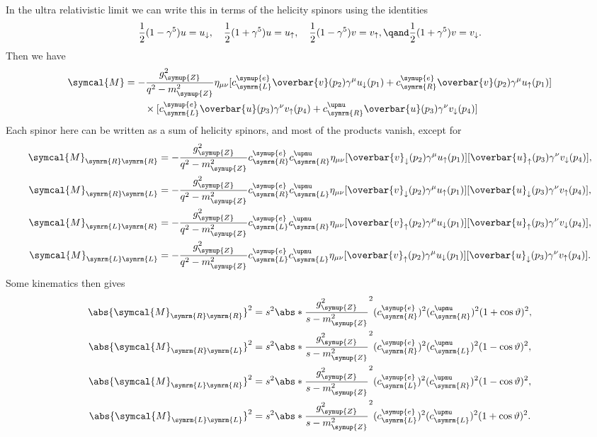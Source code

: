 \documentclass[fleqn]{NotesClass}
\newcommand{\Pparticle}[1]{\symup{#1}}
\newcommand{\Penominus}{\ensuremath{\Pparticle{e}}}
\newcommand{\PZ}{\ensuremath{\Pparticle{Z}}}
\newcommand{\amplitude}{\symcal{M}}
\newcommand{\diracadjoint}[1]{\overbar{#1}}
\newcommand{\minkowskiMetric}{\eta}
\newcommand{\Left}{\symrm{L}}
\newcommand{\Right}{\symrm{R}}
\begin{document}
    In the ultra relativistic limit we can write this in terms of the helicity spinors using the identities
    \begin{equation}
        \frac{1}{2}(1 - \gamma^5) u = u_{\downarrow}, \quad \frac{1}{2}(1 + \gamma^5)u = u_{\uparrow}, \quad \frac{1}{2}(1 - \gamma^5)v = v_{\uparrow}, \qand \frac{1}{2}(1 + \gamma^5)v = v_{\downarrow}.
    \end{equation}
    Then we have
    \begin{align}
        \amplitude &= - \frac{g_{\PZ}^2}{q^2 - m_{\PZ}^2} \minkowskiMetric_{\mu\nu} [c_{\Left}^{\Penominus} \diracadjoint{v}(p_2) \gamma^\mu u_{\downarrow}(p_1) + c_{\Right}^{\Penominus} \diracadjoint{v}(p_2) \gamma^\mu u_{\uparrow}(p_1)]\\
        &\qquad \times [c_{\Left}^{\Penominus} \diracadjoint{u}(p_3) \gamma^\nu v_{\uparrow}(p_4) + c_{\Right}^{\upmu} \diracadjoint{u}(p_3) \gamma^\nu v_{\downarrow}(p_4)]
    \end{align}
    Each spinor here can be written as a sum of helicity spinors, and most of the products vanish, except for
    \begin{align}
        \amplitude_{\Right\Right} &= -\frac{g_{\PZ}^2}{q^2 - m_{\PZ}^2} c_{\Right}^{\Penominus} c_{\Right}^{\upmu} \minkowskiMetric_{\mu\nu} [\diracadjoint{v}_{\downarrow}(p_2) \gamma^\mu u_{\uparrow}(p_1)] [\diracadjoint{u}_{\uparrow}(p_3) \gamma^\nu v_{\downarrow}(p_4)],\\
        \amplitude_{\Right\Left} &= -\frac{g_{\PZ}^2}{q^2 - m_{\PZ}^2} c_{\Right}^{\Penominus} c_{\Left}^{\upmu} \minkowskiMetric_{\mu\nu} [\diracadjoint{v}_{\downarrow}(p_2) \gamma^\mu u_{\uparrow}(p_1)] [\diracadjoint{u}_{\downarrow}(p_3) \gamma^\nu v_{\uparrow}(p_4)],\\
        \amplitude_{\Left\Right} &= -\frac{g_{\PZ}^2}{q^2 - m_{\PZ}^2} c_{\Left}^{\Penominus} c_{\Right}^{\upmu} \minkowskiMetric_{\mu\nu} [\diracadjoint{v}_{\uparrow}(p_2) \gamma^\mu u_{\downarrow}(p_1)] [\diracadjoint{u}_{\uparrow}(p_3) \gamma^\nu v_{\downarrow}(p_4)],\\
        \amplitude_{\Left\Left} &= -\frac{g_{\PZ}^2}{q^2 - m_{\PZ}^2} c_{\Left}^{\Penominus} c_{\Left}^{\upmu} \minkowskiMetric_{\mu\nu} [\diracadjoint{v}_{\uparrow}(p_2) \gamma^\mu u_{\downarrow}(p_1)] [\diracadjoint{u}_{\downarrow}(p_3) \gamma^\nu v_{\uparrow}(p_4)].
    \end{align}
    Some kinematics then gives
    \begin{align}
        \abs{\amplitude_{\Right\Right}}^2 &= s^2 \abs*{\frac{g_{\PZ}^2}{s - m_{\PZ}^2}}^2 (c_{\Right}^{\Penominus})^2 (c_{\Right}^{\upmu})^2 (1 + \cos\vartheta)^2,\\
        \abs{\amplitude_{\Right\Left}}^2 &= s^2 \abs*{\frac{g_{\PZ}^2}{s - m_{\PZ}^2}}^2 (c_{\Right}^{\Penominus})^2 (c_{\Left}^{\upmu})^2 (1 - \cos\vartheta)^2,\\
        \abs{\amplitude_{\Left\Right}}^2 &= s^2 \abs*{\frac{g_{\PZ}^2}{s - m_{\PZ}^2}}^2 (c_{\Left}^{\Penominus})^2 (c_{\Right}^{\upmu})^2 (1 - \cos\vartheta)^2,\\
        \abs{\amplitude_{\Left\Left}}^2 &= s^2 \abs*{\frac{g_{\PZ}^2}{s - m_{\PZ}^2}}^2 (c_{\Left}^{\Penominus})^2 (c_{\Left}^{\upmu})^2 (1 + \cos\vartheta)^2.
    \end{align}
\end{document}

